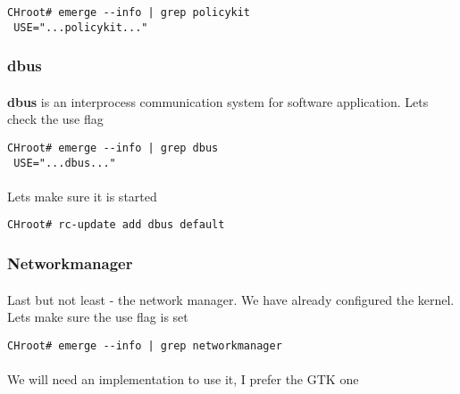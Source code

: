 \documentclass[11pt,a4paper]{article}
\begin{document}
                    \begin{lstlisting}[style=BashInputCHRoot]
 CHroot# emerge --info | grep policykit
 USE="...policykit..."
                    \end{lstlisting}

                \newpage
                \subsubsection{dbus}

                    \paragraph{} \textbf{dbus} is an interprocess communication system for software application. Lets check the use flag

                    \begin{lstlisting}[style=BashInputCHRoot]
 CHroot# emerge --info | grep dbus
 USE="...dbus..."
                    \end{lstlisting}

                    \paragraph{} Lets make sure it is started

                    \begin{lstlisting}[style=BashInputCHRoot]
 CHroot# rc-update add dbus default
                    \end{lstlisting}

                \newpage
                \subsubsection{Networkmanager}

                    \paragraph{} Last but not least - the network manager. We have already configured the kernel. Lets make sure the use flag is set

                    \begin{lstlisting}[style=BashInputCHRoot]
 CHroot# emerge --info | grep networkmanager
                    \end{lstlisting}

                    \paragraph{} We will need an implementation to use it, I prefer the GTK one
\end{document}
